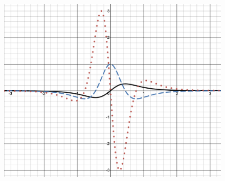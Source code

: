     \begin{figure}[h!]
 \centering
    \includegraphics[scale=0.35]{images/productQuotient/11_4.png}
    \caption{}
    \end{figure}
